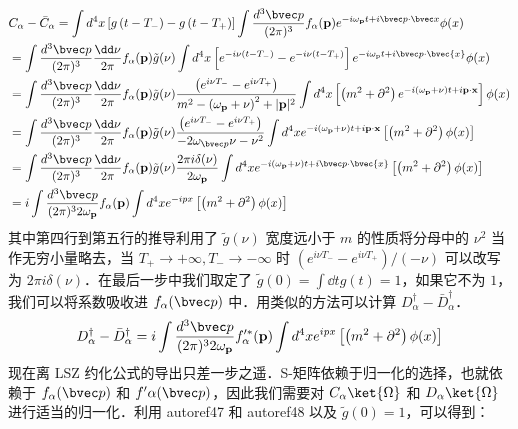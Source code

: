 \begin{equation} \begin{aligned}
&C_\alpha-\bar{C}_\alpha=\int d^4  x\left[g\left(t-T_{-}\right)-g\left(t-T_{+}\right)\right] \int \frac{d^3 {\bvec p}}{(2 \pi)^3} f_\alpha(\mathbf{p}) e^{-i \omega_{\mathbf{p}} t+i \bvec p \cdot \bvec x} \phi(x)\\
&=\int \frac{d^3{\bvec p}}{(2 \pi)^3} \frac{\dd \nu}{2 \pi} f_\alpha(\mathbf{p}) \tilde{g}(\nu) \int d^4  x\left[e^{-i \nu\left(t-T_{-}\right)}-e^{-i \nu\left(t-T_{+}\right)}\right] e^{-i \omega_{\mathrm{p}} t+i \bvec p \cdot \bvec{x}} \phi(x)\\
&=\int \frac{d^3{\bvec p}}{(2 \pi)^3} \frac{\dd \nu}{2 \pi} f_\alpha(\mathbf{p}) \tilde{g}(\nu) \frac{\left(e^{i \nu T_{-}}-e^{i \nu T_{+}}\right)}{m^2-\left(\omega_{\mathbf{p}}+\nu\right)^2+|\mathbf{p}|^2} \int d^4  x\left[\left(m^2+\partial^2\right) e^{-i\left(\omega_{\mathbf{p}}+\nu\right) t+i \mathbf{p} \cdot \mathbf{x}}\right] \phi(x)\\
&=\int \frac{d^3{\bvec p}}{(2 \pi)^3} \frac{\dd \nu}{2 \pi} f_\alpha(\mathbf{p}) \tilde{g}(\nu) \frac{\left(e^{i \nu T_{-}}-e^{i\nu T_{+}}\right)}{-2\omega_{\bvec p}\nu - \nu^2} \int d^4  x e^{-i\left(\omega_{\mathbf{p}}+\nu\right) t+i \mathbf{p} \cdot \mathbf{x}}\left[\left(m^2+\partial^2\right) \phi(x)\right]\\
&=\int \frac{d^3{\bvec p}}{(2 \pi)^3} \frac{\dd \nu}{2 \pi} f_\alpha(\mathbf{p}) \tilde{g}(\nu) \frac{2 \pi i \delta(\nu)}{2 \omega_{\mathbf{p}}} \int d^4  x e^{-i\left(\omega_{\mathbf{p}}+\nu\right) t+i \bvec p \cdot \bvec{x}}\left[\left(m^2+\partial^2\right) \phi(x)\right]\\
&=i \int \frac{d^3{\bvec p}}{(2 \pi)^3 2 \omega_{\mathbf{p}}} f_\alpha(\mathbf{p}) \int d^4 x e^{-ipx}\left[\left(m^2+\partial^2\right) \phi(x)\right]
\end{aligned}\end{equation}
其中第四行到第五行的推导利用了 $\tilde{g}(\nu)$ 宽度远小于 $m$ 的性质将分母中的 $\nu^2$ 当作无穷小量略去，当 $T_+\rightarrow +\infty,T_-\rightarrow -\infty$ 时 $(e^{i\nu T_-}-e^{i\nu T_+})/(-\nu)$ 可以改写为 $2\pi i\delta(\nu)$．在最后一步中我们取定了 $\tilde g(0)=\int \dd{t} g(t)=1$，如果它不为 $1$，我们可以将系数吸收进 $f_\alpha(\bvec p)$ 中．用类似的方法可以计算 $D_\alpha^\dagger-\bar{D}_\alpha^\dagger$．
\[
D_\alpha^\dagger-\bar{D}_\alpha^\dagger=i \int \frac{d^3{\bvec p}}{(2 \pi)^3 2 \omega_{\mathbf{p}}} f'^{*}_\alpha(\mathbf{p}) \int d^4 x e^{ipx}\left[\left(m^2+\partial^2\right) \phi(x)\right]
\]
现在离 LSZ 约化公式的导出只差一步之遥．S-矩阵依赖于归一化的选择，也就依赖于 $f_\alpha(\bvec p)$ 和 $f'\alpha(\bvec p)$，因此我们需要对 $C_\alpha\ket{\Omega}$ 和 $D_\alpha\ket{\Omega}$ 进行适当的归一化．利用 autoref47 和 autoref48 以及 $\tilde g(0)=1$，可以得到：
